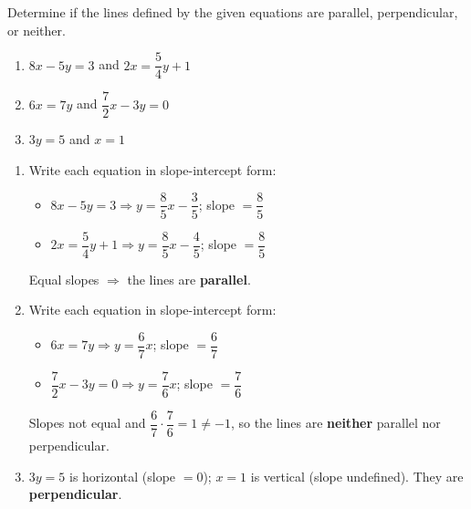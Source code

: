 \documentclass{ximera}
\begin{document}
\begin{problem}
Determine if the lines defined by the given equations are parallel, perpendicular, or neither.
\begin{enumerate}
  \item[(a)] $8x - 5y = 3$ and $2x = \dfrac{5}{4}y + 1$
  \medskip
  \item[(b)] $6x = 7y$ and $\dfrac{7}{2}x - 3y = 0$
  \medskip
  \item[(c)] $3y = 5$ and $x = 1$
\end{enumerate}

\begin{solution}
\begin{enumerate}
  \item[(a)] Write each equation in slope-intercept form:
  \begin{itemize}
    \item $8x - 5y = 3 \Rightarrow y = \dfrac{8}{5}x - \dfrac{3}{5}$; slope $= \dfrac{8}{5}$
    \item $2x = \dfrac{5}{4}y + 1 \Rightarrow y = \dfrac{8}{5}x - \dfrac{4}{5}$; slope $= \dfrac{8}{5}$
  \end{itemize}
  Equal slopes $\Rightarrow$ the lines are \textbf{parallel}.

  \item[(b)] Write each equation in slope-intercept form:
  \begin{itemize}
    \item $6x = 7y \Rightarrow y = \dfrac{6}{7}x$; slope $= \dfrac{6}{7}$
    \item $\dfrac{7}{2}x - 3y = 0 \Rightarrow y = \dfrac{7}{6}x$; slope $= \dfrac{7}{6}$
  \end{itemize}
  Slopes not equal and $\dfrac{6}{7} \cdot \dfrac{7}{6} = 1 \neq -1$, so the lines are \textbf{neither} parallel nor perpendicular.

  \item[(c)] $3y = 5$ is horizontal (slope $= 0$); $x = 1$ is vertical (slope undefined). They are \textbf{perpendicular}.
\end{enumerate}
\end{solution}
\end{problem}
\end{document}
